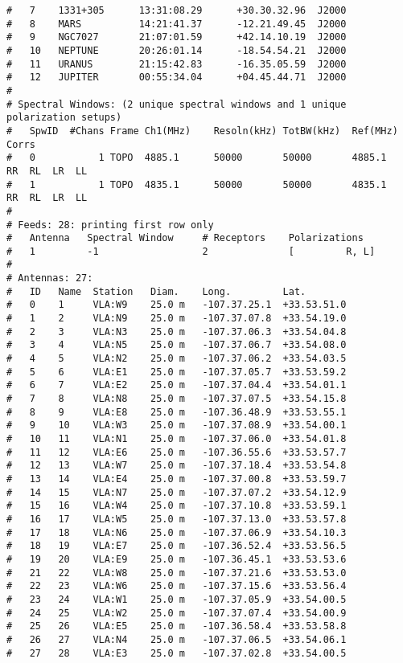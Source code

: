 \begin{verbatim}
#   7    1331+305      13:31:08.29      +30.30.32.96  J2000   
#   8    MARS          14:21:41.37      -12.21.49.45  J2000   
#   9    NGC7027       21:07:01.59      +42.14.10.19  J2000   
#   10   NEPTUNE       20:26:01.14      -18.54.54.21  J2000   
#   11   URANUS        21:15:42.83      -16.35.05.59  J2000   
#   12   JUPITER       00:55:34.04      +04.45.44.71  J2000   
# 
# Spectral Windows: (2 unique spectral windows and 1 unique polarization setups)
#   SpwID  #Chans Frame Ch1(MHz)    Resoln(kHz) TotBW(kHz)  Ref(MHz)    Corrs           
#   0           1 TOPO  4885.1      50000       50000       4885.1      RR  RL  LR  LL  
#   1           1 TOPO  4835.1      50000       50000       4835.1      RR  RL  LR  LL  
# 
# Feeds: 28: printing first row only
#   Antenna   Spectral Window     # Receptors    Polarizations
#   1         -1                  2              [         R, L]
# 
# Antennas: 27:
#   ID   Name  Station   Diam.    Long.         Lat.         
#   0    1     VLA:W9    25.0 m   -107.37.25.1  +33.53.51.0  
#   1    2     VLA:N9    25.0 m   -107.37.07.8  +33.54.19.0  
#   2    3     VLA:N3    25.0 m   -107.37.06.3  +33.54.04.8  
#   3    4     VLA:N5    25.0 m   -107.37.06.7  +33.54.08.0  
#   4    5     VLA:N2    25.0 m   -107.37.06.2  +33.54.03.5  
#   5    6     VLA:E1    25.0 m   -107.37.05.7  +33.53.59.2  
#   6    7     VLA:E2    25.0 m   -107.37.04.4  +33.54.01.1  
#   7    8     VLA:N8    25.0 m   -107.37.07.5  +33.54.15.8  
#   8    9     VLA:E8    25.0 m   -107.36.48.9  +33.53.55.1  
#   9    10    VLA:W3    25.0 m   -107.37.08.9  +33.54.00.1  
#   10   11    VLA:N1    25.0 m   -107.37.06.0  +33.54.01.8  
#   11   12    VLA:E6    25.0 m   -107.36.55.6  +33.53.57.7  
#   12   13    VLA:W7    25.0 m   -107.37.18.4  +33.53.54.8  
#   13   14    VLA:E4    25.0 m   -107.37.00.8  +33.53.59.7  
#   14   15    VLA:N7    25.0 m   -107.37.07.2  +33.54.12.9  
#   15   16    VLA:W4    25.0 m   -107.37.10.8  +33.53.59.1  
#   16   17    VLA:W5    25.0 m   -107.37.13.0  +33.53.57.8  
#   17   18    VLA:N6    25.0 m   -107.37.06.9  +33.54.10.3  
#   18   19    VLA:E7    25.0 m   -107.36.52.4  +33.53.56.5  
#   19   20    VLA:E9    25.0 m   -107.36.45.1  +33.53.53.6  
#   21   22    VLA:W8    25.0 m   -107.37.21.6  +33.53.53.0  
#   22   23    VLA:W6    25.0 m   -107.37.15.6  +33.53.56.4  
#   23   24    VLA:W1    25.0 m   -107.37.05.9  +33.54.00.5  
#   24   25    VLA:W2    25.0 m   -107.37.07.4  +33.54.00.9  
#   25   26    VLA:E5    25.0 m   -107.36.58.4  +33.53.58.8  
#   26   27    VLA:N4    25.0 m   -107.37.06.5  +33.54.06.1  
#   27   28    VLA:E3    25.0 m   -107.37.02.8  +33.54.00.5  

\end{verbatim}
